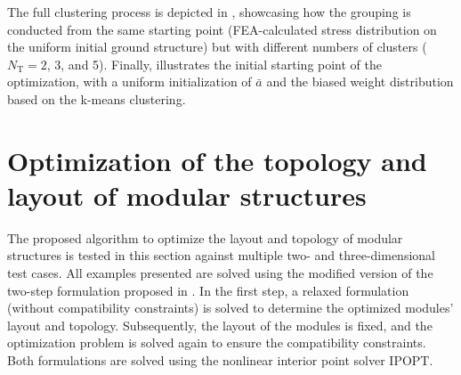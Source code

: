 The full clustering process is depicted in , showcasing how the grouping is conducted from the same starting point (FEA-calculated stress distribution on the uniform initial ground structure) but with different numbers of clusters ($N_\text{T}=2$, 3, and 5). Finally,  illustrates the initial starting point of the optimization, with a uniform initialization of $\bar{a}$ and the biased weight distribution based on the k-means clustering.

\section{Optimization of the topology and layout of modular structures}\label{sec:06_num_app}
The proposed algorithm to optimize the layout and topology of modular structures is tested in this section against multiple two- and three-dimensional test cases. All examples presented are solved using the modified version of the two-step formulation proposed in . In the first step, a relaxed formulation (without compatibility constraints) is solved to determine the optimized modules' layout and topology. Subsequently, the layout of the modules is fixed, and the optimization problem is solved again to ensure the compatibility constraints. Both formulations are solved using the nonlinear interior point solver IPOPT.

